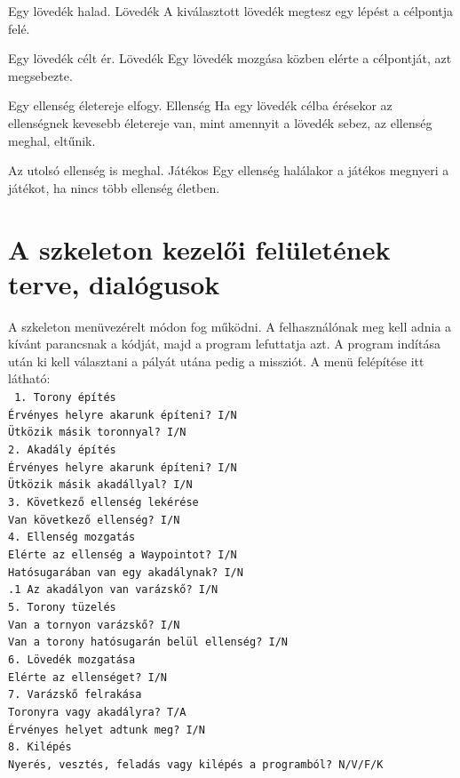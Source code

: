 {Egy lövedék halad.}
{Lövedék}
{A kiválasztott lövedék megtesz egy lépést a célpontja felé.}

{Egy lövedék célt ér.}
{Lövedék}
{Egy lövedék mozgása közben elérte a célpontját, azt megsebezte.}

{Egy ellenség életereje elfogy.}
{Ellenség}
{Ha egy lövedék célba érésekor az ellenségnek kevesebb életereje van, mint amennyit a lövedék sebez, az ellenség meghal, eltűnik.}

{Az utolsó ellenség is meghal.}
{Játékos}
{Egy ellenség halálakor a játékos megnyeri a játékot, ha nincs több ellenség életben.}

\pagebreak
\setlength\parindent{15mm}
\section{A szkeleton kezelői felületének terve, dialógusok}
A szkeleton menüvezérelt módon fog működni. A felhasználónak meg kell adnia a kívánt parancsnak a kódját, majd a program lefuttatja azt. A program indítása után ki kell választani a pályát utána pedig a missziót. A menü felépítése itt látható: \\
\begingroup 
\fontsize{10pt}{10pt}\selectfont
\texttt{
1. Torony építés \\
 Érvényes helyre akarunk építeni? I/N \\
 Ütközik másik toronnyal? I/N \\
2. Akadály építés \\
 Érvényes helyre akarunk építeni? I/N \\
 Ütközik másik akadállyal? I/N \\
3. Következő ellenség lekérése \\
 Van következő ellenség? I/N \\
4. Ellenség mozgatás \\
 Elérte az ellenség a Waypointot? I/N \\
 Hatósugarában van egy akadálynak? I/N \\
\indent {}.1 Az akadályon van varázskő? I/N \\
5. Torony tüzelés \\
 Van a tornyon varázskő? I/N \\
 Van a torony hatósugarán belül ellenség? I/N \\
6. Lövedék mozgatása \\
 Elérte az ellenséget? I/N \\
7. Varázskő felrakása \\
 Toronyra vagy akadályra? T/A \\
 Érvényes helyet adtunk meg? I/N \\
8. Kilépés \\
 Nyerés, vesztés, feladás vagy kilépés a programból? N/V/F/K \\
}
